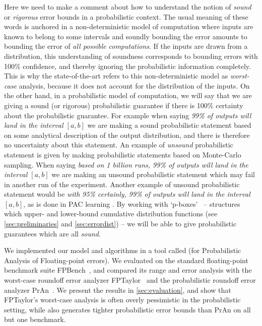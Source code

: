 Here we need to make a comment about how to understand the notion of \emph{sound} or \emph{rigorous} error bounds in a probabilistic context.  The usual meaning of these words is anchored in a non-deterministic model of computation where inputs are known to belong to some intervals and soundly bounding the error amounts to bounding the error of \emph{all possible computations}.
%
If the inputs are drawn from a distribution, this understanding of soundness corresponds to bounding errors with 100\% confidence, and thereby ignoring the probabilistic information completely.
%
This is why the state-of-the-art refers to this non-deterministic model as \emph{worst-case} analysis, because it does not account for the distribution of the inputs.
%
On the other hand, in a probabilistic model of computation,  we will say that we are giving a sound (or rigorous) probabilistic guarantee if there is 100\% certainty about the probabilistic guarantee.   For example when saying \emph{99\% of outputs will land in the interval $[a,b]$} we are making a sound probabilistic statement based on some analytical description of the output distribution, and there is therefore no uncertainty about this statement.  An example of \emph{unsound} probabilistic statement is given by making probabilistic statements based on Monte-Carlo sampling. When saying \emph{based on 1 billion runs, 99\% of outputs will land in the interval $[a,b]$} we are making an unsound probabilistic statement which may fail in another run of the experiment. Another example of unsound probabilistic statement would be \emph{with 95\% certainly, 99\% of outputs will land in the interval $[a,b]$}, as is done in \eg PAC learning \cite{valiant1984theory}.  By working with `p-boxes'~\cite{bouissou2012generalization} -- structures which upper- and lower-bound cumulative distribution functions (see \cref{sec:preliminaries} and \cref{sec:errordist}) -- we will be able to give probabilistic guarantees which are all \emph{sound}.

We implemented our model and algorithms in a tool called \Tool (for Probabilistic Analysis of Floating-point errors). We evaluated \Tool on the standard floating-point benchmark suite FPBench~\cite{fpbench}, and compared its range and error analysis with the worst-case roundoff error analyzer FPTaylor~\cite{2015_fm_sjrg,solovyev2018rigorous} and the probabilistic roundoff error analyzer PrAn~\cite{probdaisy}. We present the results in \cref{sec:evaluation},  and show that FPTaylor's worst-case analysis is often overly pessimistic in the probabilistic setting, while \Tool also generates tighter probabilistic error bounds than PrAn on all but one benchmark. 

